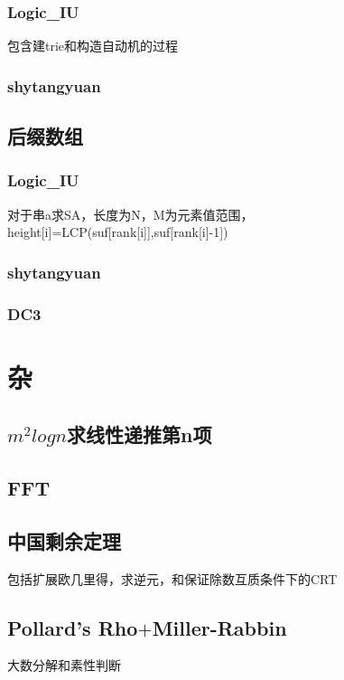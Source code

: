 \documentclass[a4paper,10pt]{book}
\begin{document}
		\subsection{Logic\_IU}
			包含建trie和构造自动机的过程
			
		\subsection{shytangyuan}
			

	\section{后缀数组}
		\subsection{Logic\_IU}
			对于串a求SA，长度为N，M为元素值范围，height[i]=LCP(suf[rank[i]],suf[rank[i]-1])
			
		\subsection{shytangyuan}
			
		\subsection{DC3}
			

\chapter{杂}
	\section{$m^2logn$求线性递推第n项}
		
	
	\section{FFT}
		

	\section{中国剩余定理}
	    包括扩展欧几里得，求逆元，和保证除数互质条件下的CRT
	    

	\section{Pollard's Rho$+$Miller-Rabbin}
	    大数分解和素性判断
	    
	
\end{document}
